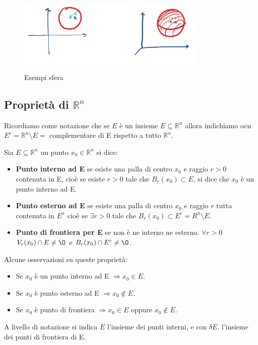 \begin{figure}[h!]
    \centering
    \includegraphics[width=9cm]{images/ess-sfera.png}
    \vspace{-20pt}
    \caption{Esempi sfera}
\end{figure}

\vspace{-10pt}
\subsection{Proprietà di $\mathbb{R}^n$}
Ricordiamo come notazione che se $E$ è un insieme $E \subseteq \mathbb{R}^n$ allora indichiamo ocn $E^c = \mathbb{R}^n \setminus E =$ complementare di E rispetto a tutto $\mathbb{R}^n$.
\begin{definition}
Sia $E \subseteq \mathbb{R}^n$ un punto $x_0 \in \mathbb{R}^n$ si dice:
\begin{itemize}
    \item \textbf{Punto interno ad E} se esiste una palla di centro $x_0$ e raggio $r > 0$ contenuta in E, cioè se esiste $r > 0$ tale che $B_r(x_0) \subset E$, si dice che $x_0$ è un punto interno ad E.
    \item \textbf{Punto esterno ad E} se esiste una palla di centro $x_0$ e raggio $r$ tutta contenuta in $E^x$ cioè se $\exists r > 0$ tale che $B_r(x_0) \subset E^c = R^n \setminus E$.
    \item \textbf{Punto di frontiera per E} se non è ne interno ne esterno. $\forall r > 0$ $V_r(x_0) \cap E \neq \O$ e $B_r(x_0) \cap E^c \neq \O$.
\end{itemize}
\end{definition}

\begin{observation}
Alcune osservazioni su queste proprietà:
\begin{itemize}
    \item Se $x_0$ è un punto interno ad E $\Longrightarrow x_0 \in E$.
    \item Se $x_0$ è punto esterno ad E $\Longrightarrow x_0 \notin E$.
    \item Se $x_0$ è punto di frontiera $\Longrightarrow x_0 \in E$ oppure $x_0 \notin E$.
\end{itemize}
\end{observation}
\hspace{-15pt}A livello di notazione si indica $\mathring{E}$ l'insieme dei punti interni, e con $\delta E$. l'insieme dei punti di frontiera di E.

